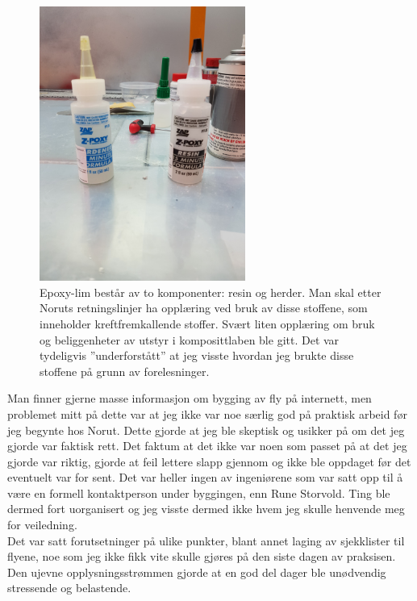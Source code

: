 \documentclass[12pt, a4paper]{article}
\begin{document}
\begin{figure}[h]
	\centering
	\includegraphics[width = .6\textwidth, height=9cm]{bilder/epoxyresin.jpg}
	\caption[Epoxy og herder]{Epoxy-lim består av to komponenter: resin og herder. Man skal etter Noruts retningslinjer ha opplæring ved bruk av disse stoffene, som inneholder kreftfremkallende stoffer. Svært liten opplæring om bruk og beliggenheter av utstyr i komposittlaben ble gitt. Det var tydeligvis ''underforstått'' at jeg visste hvordan jeg brukte disse stoffene på grunn av forelesninger.}
\end{figure}

Man finner gjerne masse informasjon om bygging av fly på internett, men problemet mitt på dette var at jeg ikke var noe særlig god på praktisk arbeid før jeg begynte hos Norut. Dette gjorde at jeg ble skeptisk og usikker på om det jeg gjorde var faktisk rett. Det faktum at det ikke var noen som passet på at det jeg gjorde var riktig, gjorde at feil lettere slapp gjennom og ikke ble oppdaget før det eventuelt var for sent. Det var heller ingen av ingeniørene som var satt opp til å være en formell kontaktperson under byggingen, enn Rune Storvold. Ting ble dermed fort uorganisert og jeg visste dermed ikke hvem jeg skulle henvende meg for veiledning. \\

Det var satt forutsetninger på ulike punkter, blant annet laging av sjekklister til flyene, noe som jeg ikke fikk vite skulle gjøres på den siste dagen av praksisen. Den ujevne opplysningsstrømmen gjorde at en god del dager ble unødvendig stressende og belastende. 
\end{document}

